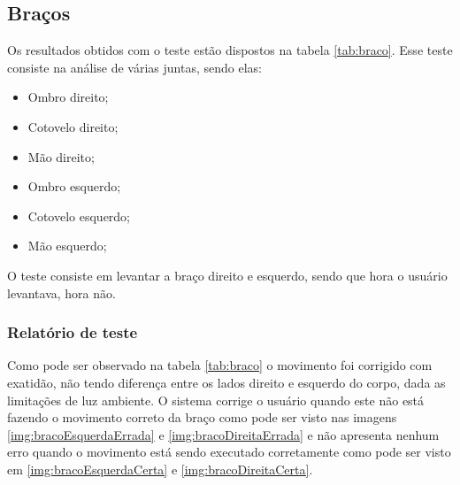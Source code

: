   \subsection{Braços}\label{sub:braco}
  Os resultados obtidos com o teste estão dispostos na tabela \ref{tab:braco}. Esse teste consiste na análise de várias juntas, sendo elas:
  \begin{itemize}
    \item Ombro direito;
    \item Cotovelo direito;
    \item Mão direito;
    \item Ombro esquerdo;
    \item Cotovelo esquerdo;
    \item Mão esquerdo;
  \end{itemize}

  O teste consiste em levantar a braço direito e esquerdo, sendo que hora o usuário levantava, hora não.

  \subsubsection{Relatório de teste}\label{sub:braco}
  Como pode ser observado na tabela \ref{tab:braco} o movimento foi corrigido com exatidão, não tendo diferença entre os lados direito e esquerdo do corpo, dada as limitações de luz ambiente. O sistema corrige o usuário quando este
  não está fazendo o movimento correto da braço como pode ser visto nas imagens \ref{img:bracoEsquerdaErrada} e \ref{img:bracoDireitaErrada} e não apresenta nenhum erro quando o movimento está sendo executado
  corretamente como pode ser visto em \ref{img:bracoEsquerdaCerta} e  \ref{img:bracoDireitaCerta}.

